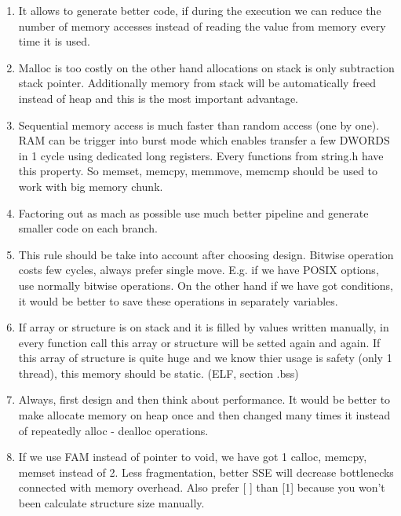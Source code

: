 \begin{enumerate}
    \item It allows to generate better code, if during the execution we can reduce the number of memory accesses instead of reading the value from memory every time it is used.
    \item Malloc is too costly on the other hand allocations on stack is only subtraction stack pointer. Additionally memory from stack will be automatically freed instead of heap and this is the most important advantage.
    \item Sequential memory access is much faster than random access (one by one). RAM can be trigger into burst mode which enables transfer a few DWORDS in 1 cycle using dedicated long registers. Every functions from string.h have this property. So memset, memcpy, memmove, memcmp should be used to work with big memory chunk.
    \item Factoring out as mach as possible use much better pipeline and generate smaller code on each branch.
    \item This rule should be take into account after choosing design. Bitwise operation costs few cycles, always prefer single move. E.g. if we have POSIX options, use normally bitwise operations. On the other hand if we have got conditions, it would be better to save these operations in separately variables.
    \item If array or structure is on stack and it is filled by values written manually, in every function call this array or structure will be setted again and again. If this array of structure is quite huge and we know thier usage is safety (only 1 thread), this memory should be static. (ELF, section .bss)
    \item Always, first design and then think about performance. It would be better to make allocate memory on heap once and then changed many times it instead of repeatedly alloc - dealloc operations.
    \item If we use FAM instead of pointer to void, we have got 1 calloc, memcpy, memset instead of 2. Less fragmentation, better SSE will decrease bottlenecks connected with memory overhead. Also prefer [ ] than [1] because you won't been calculate structure size manually.
\end{enumerate}
